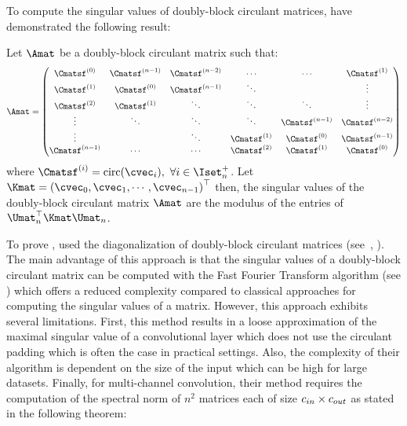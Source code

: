 To compute the singular values of doubly-block circulant matrices, \citet{sedghi2018singular} have demonstrated the following result:
\begin{theorem} \label{theorem:ch3-singular_values_doubly_block_circulant}
  Let $\Amat$ be a doubly-block circulant matrix such that:
  \begin{equation*}
    \Amat = \leftmatrix
      \Cmatsf^{(0)}   & \Cmatsf^{(n-1)} & \Cmatsf^{(n-2)} & \cdots        & \cdots          & \Cmatsf^{(1)}   \\
      \Cmatsf^{(1)}   & \Cmatsf^{(0)}   & \Cmatsf^{(n-1)} & \ddots        &                 & \vdots          \\
      \Cmatsf^{(2)}   & \Cmatsf^{(1)}   & \ddots          & \ddots        & \ddots          & \vdots          \\
      \vdots          & \ddots          & \ddots          & \ddots        & \Cmatsf^{(n-1)} & \Cmatsf^{(n-2)} \\
      \vdots          &                 & \ddots          & \Cmatsf^{(1)} & \Cmatsf^{(0)}   & \Cmatsf^{(n-1)} \\
      \Cmatsf^{(n-1)} & \cdots          & \cdots          & \Cmatsf^{(2)} & \Cmatsf^{(1)}   & \Cmatsf^{(0)}
    \rightmatrix
  \end{equation*}
  where $\Cmatsf^{(i)} = \circulant({\cvec_i}),\ \forall i \in \Iset_n^+$.
  Let $\Kmat = \leftmat \cvec_0, \cvec_1, \cdots, \cvec_{n-1} \rightmat^\top$ then, the singular values of the doubly-block circulant matrix $\Amat$ are the modulus of the entries of $\Umat_n^\top \Kmat \Umat_n$.
\end{theorem}


\noindent
To prove , \citet{sedghi2018singular} used the diagonalization of doubly-block circulant matrices (see~, ).
The main advantage of this approach is that the singular values of a doubly-block circulant matrix can be computed with the Fast Fourier Transform algorithm (see ) which offers a reduced complexity compared to classical approaches for computing the singular values of a matrix.
However, this approach exhibits several limitations.
First, this method results in a loose approximation of the maximal singular value of a convolutional layer which does not use the circulant padding which is often the case in practical settings.
Also, the complexity of their algorithm is dependent on the size of the input which can be high for large datasets.
Finally, for multi-channel convolution, their method requires the computation of the spectral norm of $n^2$ matrices each of size $c_{in} \times c_{out}$ as stated in the following theorem:


